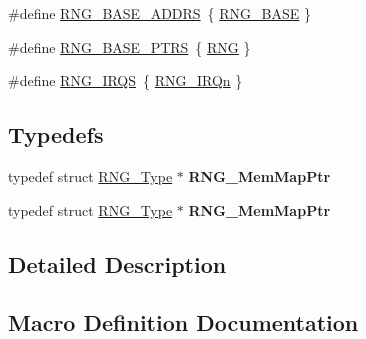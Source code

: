 \begin{DoxyCompactItemize}
\item 
\#define \hyperlink{group__RNG__Peripheral__Access__Layer_ga794b814e7cc50a77c3e540fb88945326}{R\+N\+G\+\_\+\+B\+A\+S\+E\+\_\+\+A\+D\+D\+RS}~\{ \hyperlink{group__RNG__Peripheral__Access__Layer_gab92662976cfe62457141e5b4f83d541c}{R\+N\+G\+\_\+\+B\+A\+SE} \}
\item 
\#define \hyperlink{group__RNG__Peripheral__Access__Layer_gafe29fd84164c78d03c9a7a2128caf361}{R\+N\+G\+\_\+\+B\+A\+S\+E\+\_\+\+P\+T\+RS}~\{ \hyperlink{group__RNG__Peripheral__Access__Layer_ga5b0885b8b55bbc13691092b704d9309f}{R\+NG} \}
\item 
\#define \hyperlink{group__RNG__Peripheral__Access__Layer_ga2ad5ec19e225454d775bec0771e14615}{R\+N\+G\+\_\+\+I\+R\+QS}~\{ \hyperlink{group__Interrupt__vector__numbers_gga666eb0caeb12ec0e281415592ae89083a90c4647e57cff99fac635c532802c4b5}{R\+N\+G\+\_\+\+I\+R\+Qn} \}
\end{DoxyCompactItemize}
\subsection*{Typedefs}
\begin{DoxyCompactItemize}
\item 
typedef struct \hyperlink{structRNG__Type}{R\+N\+G\+\_\+\+Type} $\ast$ {\bfseries R\+N\+G\+\_\+\+Mem\+Map\+Ptr}\hypertarget{group__RNG__Peripheral__Access__Layer_ga4b2b8e82d788ab168ccb38e4f95d484d}{}\label{group__RNG__Peripheral__Access__Layer_ga4b2b8e82d788ab168ccb38e4f95d484d}

\item 
typedef struct \hyperlink{structRNG__Type}{R\+N\+G\+\_\+\+Type} $\ast$ {\bfseries R\+N\+G\+\_\+\+Mem\+Map\+Ptr}\hypertarget{group__RNG__Peripheral__Access__Layer_ga4b2b8e82d788ab168ccb38e4f95d484d}{}\label{group__RNG__Peripheral__Access__Layer_ga4b2b8e82d788ab168ccb38e4f95d484d}

\end{DoxyCompactItemize}


\subsection{Detailed Description}


\subsection{Macro Definition Documentation}
